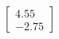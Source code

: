 \documentclass[preview]{standalone}
\begin{document}
\begin{align*}
\begin{bmatrix} 4.55 \\ -2.75 \end{bmatrix}
\end{align*}
\end{document}
